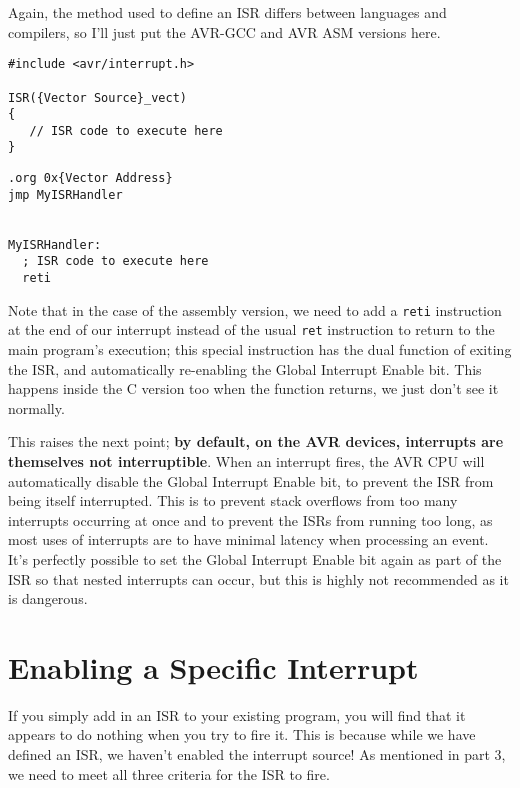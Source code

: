 \documentclass[a4paper,oneside,notitlepage]{book}
\begin{document}
Again, the method used to define an ISR differs between languages and compilers, so I'll just put the AVR-GCC and AVR ASM versions here.

\begin{center}
\begin{lstlisting}
#include <avr/interrupt.h>

ISR({Vector Source}_vect)
{
   // ISR code to execute here
}
\end{lstlisting}
\end{center}

\begin{center}
\begin{lstlisting}
.org 0x{Vector Address}
jmp MyISRHandler


MyISRHandler:
  ; ISR code to execute here
  reti
\end{lstlisting}
\end{center}

Note that in the case of the assembly version, we need to add a \texttt{reti} instruction at the end of our interrupt instead of the usual \texttt{ret} instruction to return to the main program's execution; this special instruction has the dual function of exiting the ISR, and automatically re-enabling the Global Interrupt Enable bit. This happens inside the C version too when the function returns, we just don't see it normally.

This raises the next point; \textbf{by default, on the AVR devices, interrupts are themselves not interruptible}. When an interrupt fires, the AVR CPU will automatically disable the Global Interrupt Enable bit, to prevent the ISR from being itself interrupted. This is to prevent stack overflows from too many interrupts occurring at once and to prevent the ISRs from running too long, as most uses of interrupts are to have minimal latency when processing an event. It's perfectly possible to set the Global Interrupt Enable bit again as part of the ISR so that nested interrupts can occur, but this is highly not recommended as it is dangerous.


\chapter{Enabling a Specific Interrupt}
\label{chp:EnableInt}

If you simply add in an ISR to your existing program, you will find that it appears to do nothing when you try to fire it. This is because while we have defined an ISR, we haven't enabled the interrupt source! As mentioned in part 3, we need to meet all three criteria for the ISR to fire.
\end{document}
